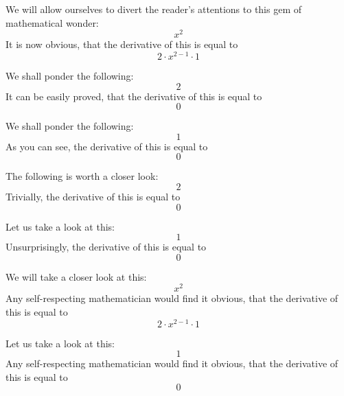 \documentclass{article}
\begin{document}
We will allow ourselves to divert the reader's attentions to this gem of mathematical wonder:
\begin{equation}
x ^{2 } 
\end{equation}
It is now obvious, that the derivative of this is equal to
\begin{equation}
2 \cdot x ^{2 - 1 } \cdot 1 
\end{equation}

We shall ponder the following:
\begin{equation}
2 
\end{equation}
It can be easily proved, that the derivative of this is equal to
\begin{equation}
0 
\end{equation}

We shall ponder the following:
\begin{equation}
1 
\end{equation}
As you can see, the derivative of this is equal to
\begin{equation}
0 
\end{equation}

The following is worth a closer look:
\begin{equation}
2 
\end{equation}
Trivially, the derivative of this is equal to
\begin{equation}
0 
\end{equation}

Let us take a look at this:
\begin{equation}
1 
\end{equation}
Unsurprisingly, the derivative of this is equal to
\begin{equation}
0 
\end{equation}

We will take a closer look at this:
\begin{equation}
x ^{2 } 
\end{equation}
Any self-respecting mathematician would find it obvious, that the derivative of this is equal to
\begin{equation}
2 \cdot x ^{2 - 1 } \cdot 1 
\end{equation}

Let us take a look at this:
\begin{equation}
1 
\end{equation}
Any self-respecting mathematician would find it obvious, that the derivative of this is equal to
\begin{equation}
0 
\end{equation}
\end{document}
